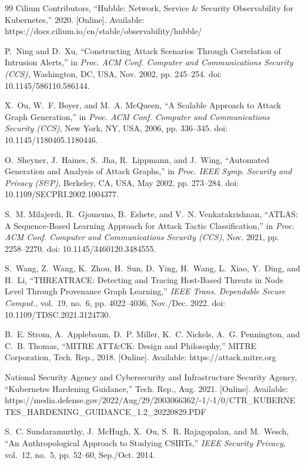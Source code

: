 \documentclass[conference]{IEEEtran}
\begin{document}
\begin{thebibliography}{99}
Cilium Contributors, ``Hubble: Network, Service \& Security Observability for
Kubernetes,'' 2020. [Online]. Available:
https://docs.cilium.io/en/stable/observability/hubble/

P.~Ning and D.~Xu, ``Constructing Attack Scenarios Through Correlation of
Intrusion Alerts,'' in \textit{Proc. ACM Conf. Computer and Communications
Security (CCS)}, Washington, DC, USA, Nov. 2002, pp. 245--254.
doi: 10.1145/586110.586144.

X.~Ou, W.~F. Boyer, and M.~A. McQueen, ``A Scalable Approach to Attack Graph
Generation,'' in \textit{Proc. ACM Conf. Computer and Communications Security
(CCS)}, New York, NY, USA, 2006, pp. 336--345. doi: 10.1145/1180405.1180446.

O.~Sheyner, J.~Haines, S.~Jha, R.~Lippmann, and J.~Wing, ``Automated
Generation and Analysis of Attack Graphs,'' in \textit{Proc. IEEE Symp.
Security and Privacy (S\&P)}, Berkeley, CA, USA, May 2002, pp. 273--284.
doi: 10.1109/SECPRI.2002.1004377.

S.~M. Milajerdi, R.~Gjomemo, B.~Eshete, and V.~N. Venkatakrishnan, ``ATLAS:
A Sequence-Based Learning Approach for Attack Tactic Classification,'' in
\textit{Proc. ACM Conf. Computer and Communications Security (CCS)}, Nov.
2021, pp. 2258--2270. doi: 10.1145/3460120.3484555.

S.~Wang, Z.~Wang, K.~Zhou, H.~Sun, D.~Ying, H.~Wang, L.~Xiao, Y.~Ding, and
H.~Li, ``THREATRACE: Detecting and Tracing Host-Based Threats in Node Level
Through Provenance Graph Learning,'' \textit{IEEE Trans. Dependable Secure
Comput.}, vol.~19, no.~6, pp. 4022--4036, Nov./Dec. 2022.
doi: 10.1109/TDSC.2021.3124730.

B.~E. Strom, A.~Applebaum, D.~P. Miller, K.~C. Nickels, A.~G. Pennington, and
C.~B. Thomas, ``MITRE ATT\&CK: Design and Philosophy,'' MITRE Corporation,
Tech. Rep., 2018. [Online]. Available: https://attack.mitre.org

National Security Agency and Cybersecurity and Infrastructure Security Agency,
``Kubernetes Hardening Guidance,'' Tech. Rep., Aug. 2021. [Online]. Available:
https://media.defense.gov/2022/Aug/29/2003066362/-1/-1/0/CTR\_KUBERNETES\_HARDENING\_GUIDANCE\_1.2\_20220829.PDF

S.~C. Sundaramurthy, J.~McHugh, X.~Ou, S.~R. Rajagopalan, and M.~Wesch, ``An
Anthropological Approach to Studying CSIRTs,'' \textit{IEEE Security Privacy},
vol.~12, no.~5, pp. 52--60, Sep./Oct. 2014.


\end{thebibliography}
\end{document}
